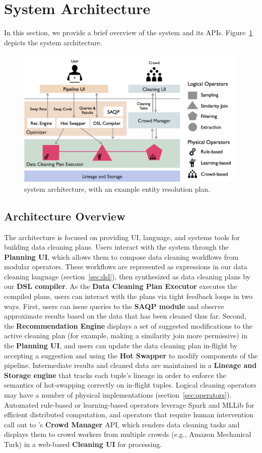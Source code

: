 \section{System Architecture}

In this section, we provide a brief overview of the \sys system and its APIs.
Figure~\ref{fig:arch} depicts the system architecture.

\begin{figure}[t]
\centering
\vspace{-0.5cm}
\includegraphics[width = .5\textwidth]{figs/architecture.png}
\vspace{-0.7cm}
\caption{\sys system architecture, with an example entity resolution plan.}
\label{fig:arch}
\end{figure}

\subsection{Architecture Overview}
The \sys architecture is focused on providing UI, language, and systems tools for building data cleaning plans.
Users interact with the system through the \textbf{Planning UI}, which allows them to compose data cleaning workflows from modular operators.
These workflows are represented as expressions in our data cleaning language (section~\ref{sec:dsl}), then synthesized as data cleaning plans by our \textbf{DSL compiler}.
As the \textbf{Data Cleaning Plan Executor} executes the compiled plans, users can interact with the plans via tight feedback loops in two ways.
First, users can issue queries to the \textbf{SAQP module} and observe approximate results based on the data that has been cleaned thus far.
Second, the \textbf{Recommendation Engine} displays a set of suggested modifications to the active cleaning plan (for example, making a similarity join more permissive) in the \textbf{Planning UI}, and users can update the data cleaning plan in-flight by accepting a suggestion and using the \textbf{Hot Swapper} to modify components of the pipeline.
Intermediate results and cleaned data are maintained in a \textbf{Lineage and Storage engine} that tracks each tuple's lineage in order to enforce the semantics of hot-swapping correctly on in-flight tuples.
Logical cleaning operators may have a number of physical implementations (section~\ref{sec:operators}).
Automated rule-based or learning-based operators leverage Spark and MLLib for efficient distributed computation, and operators that require human intervention call out to \sys's \textbf{Crowd Manager} API, which renders data cleaning tasks and displays them to crowd workers from multiple crowds (e.g., Amazon Mechanical Turk) in a web-based \textbf{Cleaning UI} for processing.

